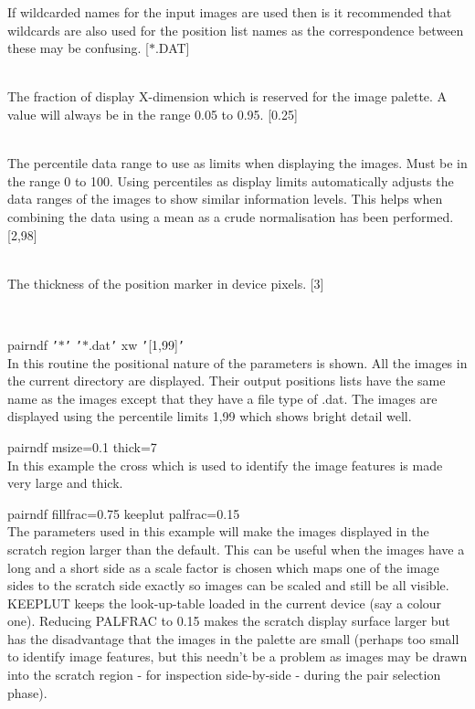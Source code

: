 \documentclass[twoside,11pt]{article}
\renewcommand{\_}{\texttt{\symbol{95}}}
\newcommand{\qs}[1]{{\tt '}#1{\tt '}}
\newcommand{\sstexamples}[1]{
   \item[Examples:] \mbox{} \\
   \vspace{-3.5ex}
   \begin{description}
      #1
   \end{description}
}
\newcommand{\sstsubsection}[1]{ \item[{#1}] \mbox{} \\}
\newcommand{\sstexamplesubsection}[2]{\sloppy \item{\ssttt #1} \mbox{} \\ #2 }
\newcommand{\sstnotes}[1]{\item[Notes:] \mbox{} \\[1.3ex] #1}
\newcommand{\sstitemlist}[1]{
  \mbox{} \\
  \vspace{-3.5ex}
  \begin{itemize}
     #1
  \end{itemize}
}
\newcommand{\sstexamples}[1]{
      \item[Examples:] \\
      \begin{description}
         #1
      \end{description}
      \\
   }
\newcommand{\sstsubsection}[1]{\item[{#1}]}
\newcommand{\sstexamplesubsection}[2]{\item[{\ssttt #1}] #2}
\newcommand{\sstnotes}[1]{\item[Notes:] #1 }
\newcommand{\sstitemlist}[1]{
      \begin{itemize}
         #1
      \end{itemize}
      \\
   }
\begin{document}
{{{         If wildcarded names for the input images are used then is it
         recommended that wildcards are also used for the position list
         names as the correspondence between these may be confusing.
         [$*$.DAT]
      }
      \sstsubsection{
         PALFRAC = \_DOUBLE (Read)
      } {
         The fraction of display X-dimension which is reserved for the
         image palette. A value will always be in the range
         0.05 to 0.95.
         [0.25]
      }
      \sstsubsection{
         PERCENTILES( 2 ) = \_DOUBLE (Read)
      } {
         The percentile data range to use as limits when displaying the
         images. Must be in the range 0 to 100. Using percentiles as
         display limits automatically adjusts the data ranges of the
         images to show similar information levels. This helps when
         combining the data using a mean as a crude normalisation has
         been performed.
         [2,98]
      }
      \sstsubsection{
         THICK = \_INTEGER (Read)
      } {
         The thickness of the position marker in device pixels.
         [3]
      }
   }
   \sstexamples{
      \sstexamplesubsection{
         pairndf \qs{$*$}  \qs{$*$.dat} xw \qs{[1,99]}
      } {
        In this routine the positional nature of the parameters is
        shown. All the images in the current directory are displayed.
        Their output positions lists have the same name as the images
        except that they have a file type of .dat. The images are
        displayed using the percentile limits 1,99 which shows bright
        detail well.
      }
      \sstexamplesubsection{
         pairndf msize=0.1 thick=7
      } {
         In this example the cross which is used to identify the
         image features is made very large and thick.
      }
      \sstexamplesubsection{
         pairndf fillfrac=0.75 keeplut palfrac=0.15
      } {
         The parameters used in this example will make the images
         displayed in the scratch region larger than the default. This
         can be useful when the images have a long and a short side as
         a scale factor is chosen which maps one of the image sides to
         the scratch side exactly so images can be scaled and still be
         all visible. KEEPLUT keeps the look-up-table loaded in the
         current device (say a colour one). Reducing PALFRAC to 0.15
         makes the scratch display surface larger but has the
         disadvantage that the images in the palette are small (perhaps
         too small to identify image features, but this needn't be a
         problem as images may be drawn into the scratch region - for
         inspection side-by-side - during the pair selection phase).
      }
   }
   \sstnotes{
      \sstitemlist{

}}}
\end{document}
